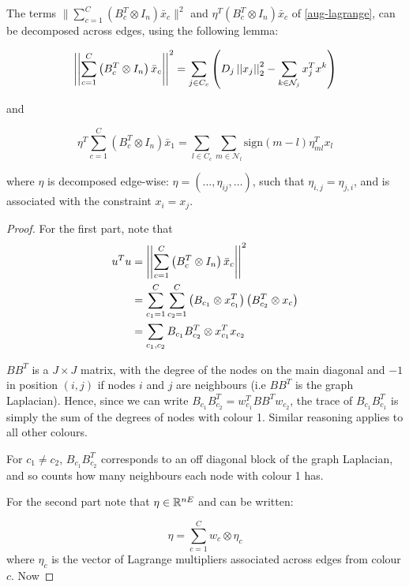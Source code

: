 The terms \(\|\sum_{c=1}^C\left(B_c^T \otimes I_n\right)\bar{x}_c\|^2\) and \( \eta^T\left(B_c^T \otimes I_n\right)\bar{x}_c \) of \eqref{aug-lagrange}, can be decomposed across edges, using the following lemma:

\begin{lemma}
\begin{equation}
\left|\left|\sum_{c=1}^C\left(B_c^T \otimes I_n\right)\bar{x}_c\right|\right|^2 = \sum_{j \in C_c}\left( D_j\left|\left|x_j\right|\right|_2^2 - \sum_{k \in \mathcal{N}_j} x_j^Tx^k\right)
\end{equation}

and

\begin{equation}
\eta^T\sum_{c=1}^C\left(B_c^T \otimes I_n\right)\bar{x}_1 = \sum_{l\in C_c} \sum_{m\in \mathcal{N}_l}\mathrm{sign}\left(m-l\right)\eta_{ml}^T x_l
\end{equation}

where \(\eta\) is decomposed edge-wise: \(\eta = \left(\ldots, \eta_{ij},\ldots\right)\), such that \(\eta_{i,j} = \eta_{j,i}\), and is associated with the constraint \(x_i = x_j\).


\begin{proof}
For the first part, note that 
\begin{align*}
u^Tu &= \left|\left|\sum_{c=1}^C\left(B_c^T \otimes I_n\right)\bar{x}_c\right|\right|^2 
\\ &=\sum	_{c_1=1}^C \sum	_{c_2=1}^C  \left(B_{c_1} \otimes x_{c_1}^T\right) \left(B_{c_2}^T \otimes x_c\right) \\
&= \sum_{c_1, c_2} B_{c_1}B_{c_2}^T \otimes x_{c_1}^Tx_{c_2}
\end{align*}

\(BB^T\) is a \(J \times J\) matrix, with the degree of the nodes on the main diagonal and \(-1\) in position \(\left(i,j\right)\) if nodes \(i\) and \(j\) are neighbours (i.e \(BB^T\) is the graph Laplacian). Hence, since we can write \(B_{c_1}B_{c_2}^T = w_{c_1}^TBB^Tw_{c_2}\), the trace of \(B_{c_1}B_{c_1}^T\) is simply the sum of the degrees of nodes with colour 1. Similar reasoning applies to all other colours.

For \(c_1 \neq c_2\),  \(B_{c_1}B_{c_2}^T\) corresponds to an off diagonal block of the graph Laplacian, and so counts how many neighbours each node with colour 1 has.

For the second part note that \(\eta \in {\mathbb{R}}^{nE}\) and can be written:

\begin{equation}
\eta = \sum_{c=1}^C w_c \otimes \eta_c
\end{equation}
where \(\eta_c\) is the vector of Lagrange multipliers associated across edges from colour \(c\). Now


\end{proof}
\end{lemma}
